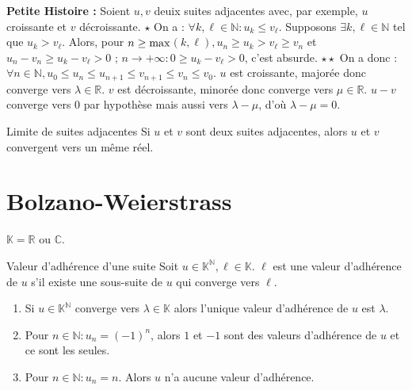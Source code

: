 \documentclass[12pt,a4paper]{report}
\begin{document}
\textbf{Petite Histoire :}
\newline Soient $u,v$ deuix suites adjacentes avec, par exemple, $u$ croissante et $v$ décroissante.
\newline $\star$ On a : $\forall k,\ell \in \mathbb{N} : u_k \leq v_\ell$. 
\newline Supposons $\exists k,\ell \in \mathbb{N}$ tel que $u_k > v_\ell$.
\newline Alors, pour $n \geq \rm{max}$$(k,\ell), u_n \geq u_k > v_\ell \geq v_n$ et $u_n - v_n \geq u_k - v_\ell > 0$ ; $n \rightarrow +\infty : 0 \geq u_k - v_\ell > 0$, c'est absurde.
\newline $\star \star$ On a donc : $\forall n \in \mathbb{N}, u_0 \leq u_n \leq u_{n+1} \leq v_{n+1} \leq v_n \leq v_0$. 
\newline $u$ est croissante, majorée donc converge vers $\lambda \in \mathbb{R}$.
\newline $v$ est décroissante, minorée donc converge vers $\mu \in \mathbb{R}$.
\newline $u-v$ converge vers $0$ par hypothèse mais aussi vers $\lambda - \mu$, d'où $\lambda -\mu = 0$.

\begin{theoreme}{Limite de suites adjacentes}{}
Si $u$ et $v$ sont deux suites adjacentes, alors $u$ et $v$ convergent vers un même réel.
\end{theoreme}

\newpage

\section{Bolzano-Weierstrass}

$\mathbb{K} = \mathbb{R}$ ou $\mathbb{C}$.

\begin{definition}{Valeur d'adhérence d'une suite}
Soit $u \in \mathbb{K}^\mathbb{N}, \ell \in \mathbb{K}$. $\ell$ est une valeur d'adhérence de $u$ s'il existe une sous-suite de $u$ qui converge vers $\ell$.
\end{definition}

\begin{exemple}[Exemples]
\begin{enumerate}
\item Si $u \in \mathbb{K}^\mathbb{N}$ converge vers $\lambda \in \mathbb{K}$ alors l'unique valeur d'adhérence de $u$ est $\lambda$.
\item Pour $n \in \mathbb{N} : u_n = (-1)^n$, alors $1$ et $-1$ sont des valeurs d'adhérence de $u$ et ce sont les seules.
\item Pour $n \in \mathbb{N} : u_n = n$. Alors $u$ n'a aucune valeur d'adhérence.
\end{enumerate}
\end{exemple}
\end{document}
